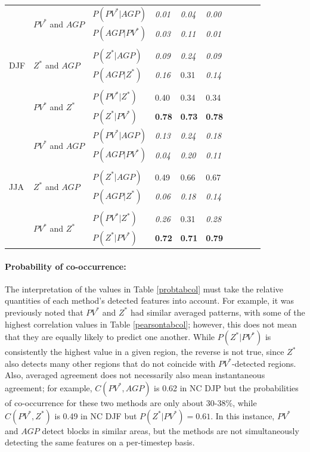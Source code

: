 \documentclass[smallextended]{svjour3}       %
\numberwithin{equation}{section}
\begin{document}
\begin{table}
\begin{tabular}{|l|l|l|l|l|l|l|l|l|l|}
  \hline
  \multirow{8}{*}{DJF} 
   & \multirow{2}{*}{$PV^* $ and $AGP$}&$P(PV^*|AGP)$ & \textit{{0.01}} & \textit{{0.04} }& \textit{{0.00}} \\
   & & $P(AGP|PV^*)$ & \textit{{0.03}} & \textit{0.11}& \textit{{0.01}} \\ 
      &&&&&\\
   & \multirow{2}{*}{$Z^*$ and $AGP$} &$P(Z^*|AGP)$  & \textit{0.09} & \textit{{0.24}} & \textit{0.09} \\ 
   &&$P(AGP|Z^*)$  & \textit{{0.16} }& {{0.31} }& \textit{{0.14} }\\ 
      &&&&&\\
      & \multirow{2}{*}{$PV^*$ and $Z^*$ } &$P(PV^*|Z^*)$    & {0.40} & {0.34} & {0.34} \\
   &&$P(Z^*|PV^*)$   &\textbf{0.78} & \textbf{0.73} & \textbf{0.78} \\   
   \hline
\multirow{8}{*}{JJA} 
   & \multirow{2}{*}{$PV^* $ and $AGP$}&$P(PV^*|AGP)$ & \textit{0.13} & \textit{0.24} & \textit{0.18} \\  
   & & $P(AGP|PV^*)$  &\textit{{0.04}} & \textit{{0.20}} & \textit{{0.11}} \\ 
   &&&&&\\
   & \multirow{2}{*}{$Z^*$ and $AGP$} &$P(Z^*|AGP)$  & {0.49} & {0.66} & {0.67} \\  
   &&$P(AGP|Z^*)$    & \textit{{0.06}} & \textit{{0.18}} & \textit{{0.14}} \\ 
      &&&&&\\
      & \multirow{2}{*}{$PV^*$ and $Z^*$ } &$P(PV^*|Z^*)$    & \textit{{0.26}} & {{0.31}}& \textit{{0.28}} \\ 
   &&$P(Z^*|PV^*)$   & \textbf{{0.72}} & {\textbf{0.71}} & \textbf{0.79} \\ 
   
  \hline
\end{tabular}
\end{table}

\paragraph{Probability of co-occurrence:} The interpretation of the values in Table \ref{probtabcol} must take the relative quantities of each method's detected features into account. For example, it was previously noted that $PV^*$ and $Z^*$ had similar averaged patterns, with some of the highest correlation values in Table \ref{pearsontabcol}; however, this does not mean that they are equally likely to predict one another. While $P(Z^*|PV^*)$ is consistently the highest value in a given region, the reverse is not true, since $Z^*$ also detects many other regions that do not coincide with $PV^*$-detected regions. Also, averaged agreement does not necessarily also mean instantaneous agreement; for example, $C(PV^*, AGP)$ is 0.62 in NC DJP but the probabilities of co-occurrence for these two methods are only about 30-38\%, while $C(PV^*, Z^*)$ is 0.49 in NC DJF but $P(Z^*|PV^*)=0.61$. In this instance, $PV^*$ and $AGP$ detect blocks in similar areas, but the methods are not simultaneously detecting the same features on a per-timestep basis. 
\end{document}
